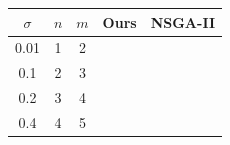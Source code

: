 \begin{table}[h]
\centering
\begin{tabular}{|c|c|c|c|c|}
\hline
$\sigma$ & $n$ & $m$ & Ours & NSGA-II \\
\hline
0.01 & 1 & 2 & \hspace{1cm} & \hspace{1cm} \\
\hline
0.1 & 2 & 3 & \hspace{1cm} & \hspace{1cm} \\
\hline
0.2 & 3 & 4 & \hspace{1cm} & \hspace{1cm} \\
\hline
0.4 & 4 & 5 & \hspace{1cm} & \hspace{1cm} \\
\hline
\end{tabular}
\label{tab:results}
\end{table}